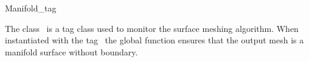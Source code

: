 

\begin{ccRefClass}{Manifold_tag}  %


\ccDefinition
  
The class \ccRefName\ is a tag class used to monitor the
surface meshing algorithm. When instantiated with the tag
\ccRefName\, the global function 
ensures that the output mesh  is a  manifold surface
without boundary.











\ccSeeAlso

\\
 \\





\end{ccRefClass}


